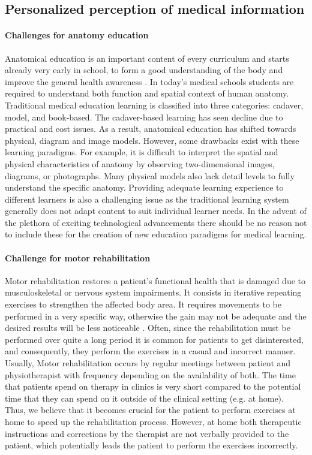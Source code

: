 \subsection{Personalized perception of medical information}
\paragraph{Challenges for anatomy education}
Anatomical education is an important content of every curriculum and starts already very early in school, to form a good understanding of the body and improve the general health awareness \CN. In today's medical schools students are required to understand both function and spatial context of human anatomy. Traditional medical education learning is classified into three categories: cadaver, model, and book-based. The cadaver-based learning has seen decline due to practical and cost issues. As a result, anatomical education has shifted towards physical, diagram and image models. However, some drawbacks exist with these learning paradigms. For example, it is difficult to interpret the spatial and physical characteristics of anatomy by observing two-dimensional images, diagrams, or photographs. Many physical models also lack detail levels to fully understand the specific anatomy. Providing adequate learning experience to different learners is also a challenging issue as the traditional learning system generally does not adapt content to suit individual learner needs.
In the advent of the plethora of exciting technological advancements there should be no reason not to include these for the creation of new education paradigms for medical learning. 

\paragraph{Challenge for motor rehabilitation}
Motor rehabilitation restores a patient's functional health that is damaged due to musculoskeletal or nervous system impairments. It consists in iterative repeating exercises to strengthen the affected body area. It requires movements to be performed in a very specific way, otherwise the gain may not be adequate and the desired results will be less noticeable \cite{Merians2006,Ustinova2014}. Often, since the rehabilitation must be performed over quite a long period it is common for patients to get disinterested, and consequently, they perform the exercises in a casual and incorrect manner. Usually, Motor rehabilitation occurs by regular meetings between patient and physiotherapist with frequency depending on the availability of both. The time that patients spend on therapy in clinics is very short compared to the potential time that they can spend on it outside of the clinical setting (e.g. at home). Thus, we believe that it becomes crucial for the patient to perform exercises at home to speed up the rehabilitation process. However, at home both therapeutic instructions and corrections by the therapist are not verbally provided to the patient, which potentially leads the patient to perform the exercises incorrectly.

